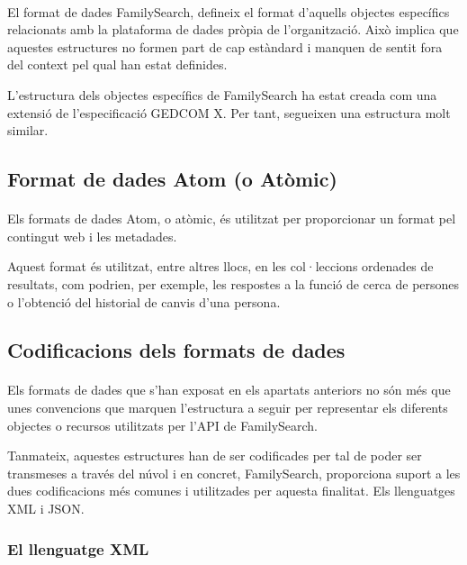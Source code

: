         \paragraph{}
        El format de dades FamilySearch, defineix el format d'aquells objectes específics relacionats amb la plataforma de dades pròpia de l'organització. Això implica que aquestes estructures no formen part de cap estàndard i manquen de sentit fora del context pel qual han estat definides.

        L'estructura dels objectes específics de FamilySearch ha estat creada com una extensió de l'especificació GEDCOM X. Per tant, segueixen una estructura molt similar.


    \subsection{Format de dades Atom (o Atòmic)}

        \paragraph{}
        Els formats de dades Atom, o atòmic, és utilitzat per proporcionar un format pel contingut web i les metadades.

        Aquest format és utilitzat, entre altres llocs, en les col·leccions ordenades de resultats, com podrien, per exemple, les respostes a la funció de cerca de persones o l'obtenció del historial de canvis d’una persona.


    \subsection{Codificacions dels formats de dades}

        \paragraph{}
        Els formats de dades que s’han exposat en els apartats anteriors no són més que unes convencions que marquen l'estructura a seguir per representar els diferents objectes o recursos utilitzats per l'API de FamilySearch.

        Tanmateix, aquestes estructures han de ser codificades per tal de poder ser transmeses a través del núvol i en concret, FamilySearch, proporciona suport a les dues codificacions més comunes i utilitzades per aquesta finalitat. Els llenguatges XML i JSON.


        \subsubsection{El llenguatge XML}

